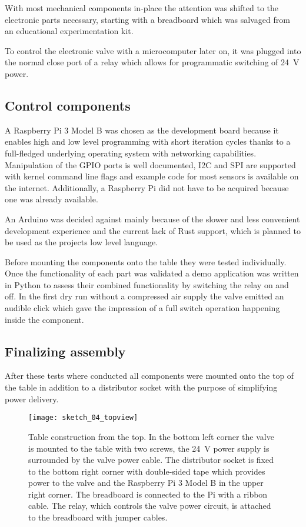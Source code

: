 With most mechanical components in-place the attention was shifted to the electronic parts necessary, starting with a breadboard which was salvaged from an educational experimentation kit. 

To control the electronic valve with a microcomputer later on, it was plugged into the normal close port of a relay which allows for programmatic switching of \SI{24}{\volt} power. 

\subsection{Control components}
A Raspberry Pi 3 Model B \cite{raspberry-pi} was chosen as the development board because it enables high and low level programming with short iteration cycles thanks to a full-fledged underlying operating system \cite{raspbian} with networking capabilities. Manipulation of the GPIO ports is well documented, I2C and SPI are supported with kernel command line flags and example code for most sensors is available on the internet. Additionally, a Raspberry Pi did not have to be acquired because one was already available. 


An Arduino was decided against mainly because of the slower and less convenient development experience and the current lack of Rust \cite{rust} support, which is planned to be used as the projects low level language.

Before mounting the components onto the table they were tested individually. Once the functionality of each part was validated a demo application was written in Python to assess their combined functionality by switching the relay on and off. In the first dry run without a compressed air supply the valve emitted an audible click which gave the impression of a full switch operation happening inside the component.

\subsection{Finalizing assembly}
After these tests where conducted all components were mounted onto the top of the table in addition to a distributor socket with the purpose of simplifying power delivery.

\begin{figure}[h]
\centering

\texttt{[image: sketch\_04\_topview]}

\caption{Table construction from the top. In the bottom left corner the valve is mounted to the table with two screws, the \SI{24}{\volt} power supply is surrounded by the valve power cable. The distributor socket is fixed to the bottom right corner with double-sided tape which provides power to the valve and the Raspberry Pi 3 Model B in the upper right corner. The breadboard is connected to the Pi with a ribbon cable. The relay, which controls the valve power circuit, is attached to the breadboard with jumper cables.}
\end{figure}


